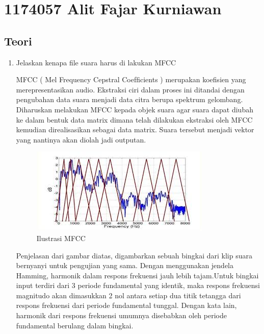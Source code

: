 \section{1174057 Alit Fajar Kurniawan}
\subsection{Teori}
\begin{enumerate}
\item Jelaskan kenapa ﬁle suara harus di lakukan MFCC
\par  MFCC ( Mel Frequency Cepstral Coefﬁcients ) merupakan koeﬁsien yang merepresentasikan audio. Ekstraksi ciri dalam proses ini ditandai dengan pengubahan data suara menjadi data citra berupa spektrum gelombang. Diharuskan melakukan MFCC kepada objek suara agar suara dapat diubah ke dalam bentuk data matrix dimana telah dilakukan ekstraksi oleh MFCC kemudian direalisasikan sebagai data matrix. Suara tersebut menjadi vektor yang nantinya akan diolah jadi outputan.

\begin{figure}[H]
\centering
\includegraphics[scale=0.5]{figures/1174057/chapter6/1.jpg}
\caption{Ilustrasi MFCC}
\label{Ilustrasi MFCC}
\end{figure}

\par Penjelasan dari gambar diatas, digambarkan sebuah bingkai dari klip suara bernyanyi untuk pengujian yang sama. Dengan menggunakan jendela Hamming, harmonik dalam respons frekuensi jauh lebih tajam.Untuk bingkai input terdiri dari 3 periode fundamental yang identik, maka respons frekuensi magnitudo akan dimasukkan 2 nol antara setiap dua titik tetangga dari respons frekuensi dari periode fundamental tunggal. Dengan kata lain, harmonik dari respons frekuensi umumnya disebabkan oleh periode fundamental berulang dalam bingkai.


\end{enumerate}
